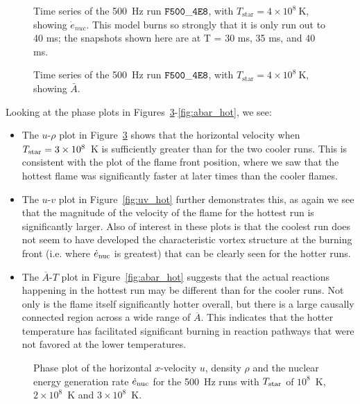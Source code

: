 \documentclass[preprint,times,tighten]{aastex63}
\begin{document}
\begin{figure}[t]
	\centering
	\caption{\label{fig:4e8_stacked_enuc} Time series of the 500~Hz run $\tt{F500\_4E8}$, with $T_{\mathrm{star}} = 4 \times 10^8~\mathrm{K}$, showing $\dot{e}_{nuc}$. This model burns so strongly that it is only run out to 40 ms; the snapshots shown here are at T = 30 ms, 35 ms, and 40 ms.}
\end{figure}

\begin{figure}[t]
	\centering
	\caption{\label{fig:4e8_stacked_abar} Time series of the 500~Hz run $\tt{F500\_4E8}$, with $T_{\mathrm{star}} = 4 \times 10^8~\mathrm{K}$, showing $\bar{A}$.}
\end{figure}

Looking at the phase plots in Figures~\ref{fig:urho_hot}-\ref{fig:abar_hot}, we see:
\begin{itemize}
    \item The $u$-$\rho$ plot in Figure~\ref{fig:urho_hot} shows that the horizontal velocity when $T_{\rm star} = 3\times10^8$~K is sufficiently greater than for the two cooler runs. This is consistent with the plot of the flame front position, where we saw that the hottest flame was significantly faster at later times than the cooler flames.
    \item The $u$-$v$ plot in Figure~\ref{fig:uv_hot} further demonstrates this, as again we see that the magnitude of the velocity of the flame for the hottest run is significantly larger. Also of interest in these plots is that the coolest run does not seem to have developed the characteristic vortex structure at the burning front (i.e. where $\dot{e}_{\rm nuc}$ is greatest) that can be clearly seen for the hotter runs.
    \item The $\overline{A}$-$T$ plot in Figure~\ref{fig:abar_hot} suggests that the actual reactions happening in the hottest run may be different than for the cooler runs. Not only is the flame itself significantly hotter overall, but there is a large causally connected region across a wide range of $\overline{A}$. This indicates that the hotter temperature has facilitated significant burning in reaction pathways that were not favored at the lower temperatures.
\end{itemize}

\begin{figure}[t]
    \centering
    \caption{\label{fig:urho_hot}Phase plot of the horizontal $x$-velocity $u$, density $\rho$ and the nuclear energy generation rate $\dot{e}_{\rm nuc}$ for the 500~Hz runs with $T_{\rm star}$ of $10^8$~K, $2\times10^8$~K and $3\times10^8$~K.}
\end{figure}
\end{document}
